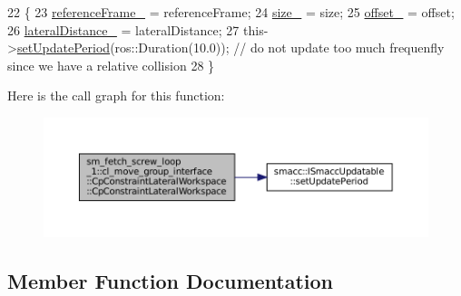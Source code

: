 \begin{DoxyCode}
22         \{
23             \hyperlink{classsm__fetch__screw__loop__1_1_1cl__move__group__interface_1_1CpConstraintLateralWorkspace_a3f1268890fe5063ae3d87d8105a4570b}{referenceFrame\_} = referenceFrame;
24             \hyperlink{classsm__fetch__screw__loop__1_1_1cl__move__group__interface_1_1CpConstraintLateralWorkspace_a366a13dee9298d95900d1b905feb9216}{size\_} = size;
25             \hyperlink{classsm__fetch__screw__loop__1_1_1cl__move__group__interface_1_1CpConstraintLateralWorkspace_aaaae72f0dc5399d64e9c487ea92908b1}{offset\_} = offset;
26             \hyperlink{classsm__fetch__screw__loop__1_1_1cl__move__group__interface_1_1CpConstraintLateralWorkspace_ad60029ecb5383b31d00013dca1200f25}{lateralDistance\_} = lateralDistance;
27             this->\hyperlink{classsmacc_1_1ISmaccUpdatable_a88f3b092a81b2d8810a9776c8c69855b}{setUpdatePeriod}(ros::Duration(10.0)); \textcolor{comment}{// do not update too much frequenfly
       since we have a relative collision}
28         \}
\end{DoxyCode}
Here is the call graph for this function\+:
\nopagebreak
\begin{figure}[H]
\begin{center}
\leavevmode
\includegraphics[width=350pt]{classsm__fetch__screw__loop__1_1_1cl__move__group__interface_1_1CpConstraintLateralWorkspace_a71e7319cbd647941b2df3fe874f93935_cgraph}
\end{center}
\end{figure}


\subsection{Member Function Documentation}
\mbox{\label{classsm__fetch__screw__loop__1_1_1cl__move__group__interface_1_1CpConstraintLateralWorkspace_a0175f39854a8b063e202bbd418144d09}} 
